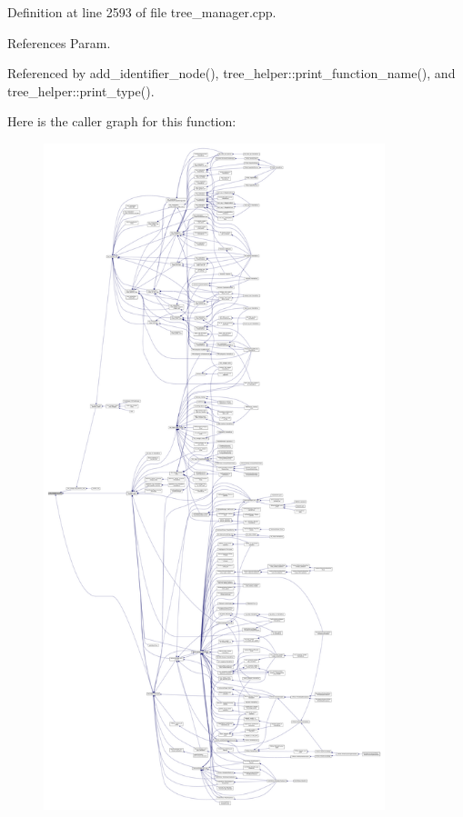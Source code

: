 Definition at line 2593 of file tree\+\_\+manager.\+cpp.



References Param.



Referenced by add\+\_\+identifier\+\_\+node(), tree\+\_\+helper\+::print\+\_\+function\+\_\+name(), and tree\+\_\+helper\+::print\+\_\+type().

Here is the caller graph for this function\+:
\nopagebreak
\begin{figure}[H]
\begin{center}
\leavevmode
\includegraphics[height=550pt]{d2/ddd/classtree__manager_aa773de2157d22f12e2b48a486dbc17aa_icgraph}
\end{center}
\end{figure}
\mbox{\label{classtree__manager_afc6bce0d4cba04bf033ad17f3fc9c5c1}} 
